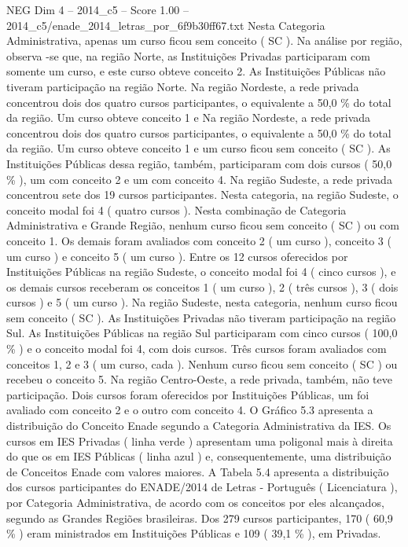 \begin{textsample}{NEG Dim 4 – 2014\_c5 – Score 1.00 – 2014\_c5/enade\_2014\_letras\_por\_6f9b30ff67.txt}
Nesta Categoria Administrativa, apenas um curso ficou sem conceito ( SC ).
Na análise por região, observa -se que, na região Norte, as Instituições Privadas participaram com somente um curso, e este curso obteve conceito 2.
As Instituições Públicas não tiveram participação na região Norte.
Na região Nordeste, a rede privada concentrou dois dos quatro cursos participantes, o equivalente a 50,0 \% do total da região.
Um curso obteve conceito 1 e Na região Nordeste, a rede privada concentrou dois dos quatro cursos participantes, o equivalente a 50,0 \% do total da região.
Um curso obteve conceito 1 e um curso ficou sem conceito ( SC ).
As Instituições Públicas dessa região, também, participaram com dois cursos ( 50,0 \% ), um com conceito 2 e um com conceito 4.
Na região Sudeste, a rede privada concentrou sete dos 19 cursos participantes.
Nesta categoria, na região Sudeste, o conceito modal foi 4 ( quatro cursos ).
Nesta combinação de Categoria Administrativa e Grande Região, nenhum curso ficou sem conceito ( SC ) ou com conceito 1.
Os demais foram avaliados com conceito 2 ( um curso ), conceito 3 ( um curso ) e conceito 5 ( um curso ).
Entre os 12 cursos oferecidos por Instituições Públicas na região Sudeste, o conceito modal foi 4 ( cinco cursos ), e os demais cursos receberam os conceitos 1 ( um curso ), 2 ( três cursos ), 3 ( dois cursos ) e 5 ( um curso ).
Na região Sudeste, nesta categoria, nenhum curso ficou sem conceito ( SC ).
As Instituições Privadas não tiveram participação na região Sul.
As Instituições Públicas na região Sul participaram com cinco cursos ( 100,0 \% ) e o conceito modal foi 4, com dois cursos.
Três cursos foram avaliados com conceitos 1, 2 e 3 ( um curso, cada ).
Nenhum curso ficou sem conceito ( SC ) ou recebeu o conceito 5.
Na região Centro-Oeste, a rede privada, também, não teve participação.
Dois cursos foram oferecidos por Instituições Públicas, um foi avaliado com conceito 2 e o outro com conceito 4.
O Gráfico 5.3 apresenta a distribuição do Conceito Enade segundo a Categoria Administrativa da IES.
Os cursos em IES Privadas ( linha verde ) apresentam uma poligonal mais à direita do que os em IES Públicas ( linha azul ) e, consequentemente, uma distribuição de Conceitos Enade com valores maiores.
A Tabela 5.4 apresenta a distribuição dos cursos participantes do ENADE/2014 de Letras - Português ( Licenciatura ), por Categoria Administrativa, de acordo com os conceitos por eles alcançados, segundo as Grandes Regiões brasileiras.
Dos 279 cursos participantes, 170 ( 60,9 \% ) eram ministrados em Instituições Públicas e 109 ( 39,1 \% ), em Privadas.

\end{textsample}
